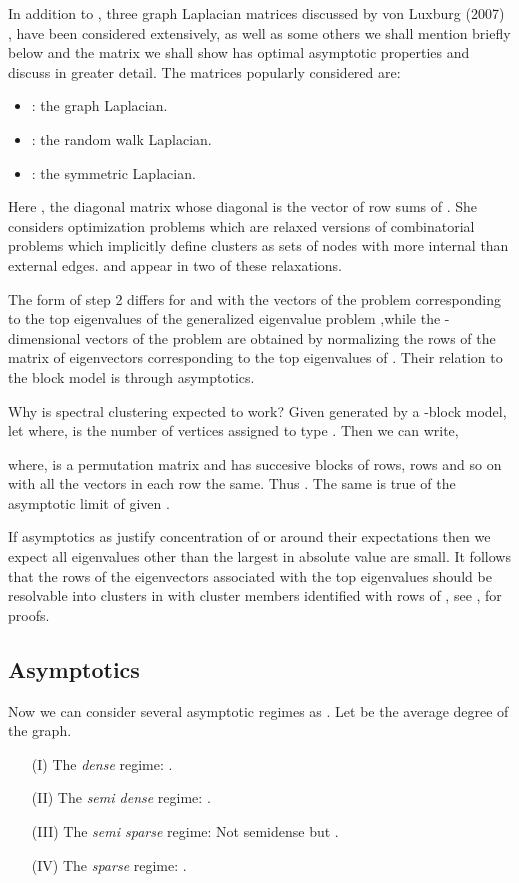\documentclass[graybox]{svmult}
\begin{document}
In addition to , three graph Laplacian matrices discussed by von Luxburg (2007) \cite{von2007tutorial}, have been considered  extensively, as well as some others we shall mention briefly below and the matrix we shall  show has optimal asymptotic properties and discuss in greater detail. The matrices popularly considered are:
\begin{itemize}
\item :  the graph Laplacian.
\item : the random walk Laplacian.
\item : the symmetric Laplacian. 
\end{itemize}

Here , the diagonal matrix whose diagonal is  the vector  of row sums of .
She considers  optimization problems which are relaxed versions of  combinatorial problems which implicitly define clusters as sets of nodes with more internal than external edges.  and  appear in two of these relaxations. 


The form of step 2 differs for  and   with  the  vectors of the  problem corresponding to the top  eigenvalues of the generalized eigenvalue problem  ,while the  -dimensional vectors of the  problem are obtained by normalizing the rows of the matrix of  eigenvectors corresponding to the  top  eigenvalues  of . Their relation to the  block model is through asymptotics. 

Why is spectral clustering expected to work? Given  generated by a -block model, let  where,  is the number of vertices assigned to type . Then we can write,

where,  is a permutation matrix and  has succesive blocks of  rows,  rows and so on with all the vectors in each row the same. Thus . The same is true of the asymptotic limit of  given .

If asymptotics as  justify concentration of  or  around their expectations then we expect all eigenvalues other than the largest  in absolute value are small. It follows that the  rows of the  eigenvectors associated with the top  eigenvalues should be resolvable into  clusters in  with cluster members identified with rows of , see \cite{MR2893856}, \cite{MR3010899} for proofs.

\subsection{Asymptotics}
\label{sec_asymp}
Now we can consider several  asymptotic regimes  as . Let   be the average degree of the graph.
\begin{itemize}
\item[(I)] \hspace{0.05in} The \emph{dense} regime:  .
\item[(II)] \hspace{0.05in} The \emph{semi dense} regime: .
\item[(III)]  \hspace{0.05in} The \emph{semi sparse} regime: Not semidense but .
\item[(IV)] \hspace{0.05in} The \emph{sparse} regime: .
\end{itemize}
\end{document}
